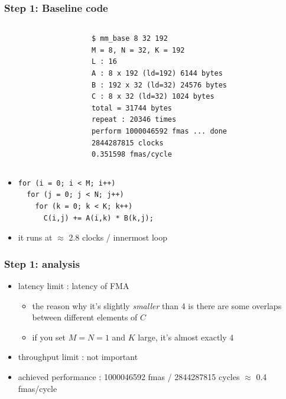 \documentclass[12pt,dvipdfmx]{beamer}
\newcommand{\ao}[1]{{\color{blue}#1}}
\begin{document}
\begin{frame}[fragile]
\frametitle{Step 1: Baseline code}

\begin{columns}
  \begin{column}{0.55\textwidth}
\begin{center}
\def\svgwidth{0.8\textwidth}
{\scriptsize }
\end{center}
  \end{column}
  \begin{column}{0.4\textwidth}
\begin{lstlisting}
$ mm_base 8 32 192
M = 8, N = 32, K = 192
L : 16
A : 8 x 192 (ld=192) 6144 bytes
B : 192 x 32 (ld=32) 24576 bytes
C : 8 x 32 (ld=32) 1024 bytes
total = 31744 bytes
repeat : 20346 times
perform 1000046592 fmas ... done
2844287815 clocks
0.351598 fmas/cycle
\end{lstlisting}%
  \end{column}
\end{columns}

\begin{itemize}
\item []
\begin{lstlisting}
for (i = 0; i < M; i++)  
  for (j = 0; j < N; j++)  
    for (k = 0; k < K; k++)  
      C(i,j) += A(i,k) * B(k,j);
\end{lstlisting}
\end{itemize}

\begin{itemize}
\item it runs at $\approx$ 2.8 clocks / innermost loop
\end{itemize}
\end{frame}

\begin{frame}[fragile]
\frametitle{Step 1: analysis}
\begin{itemize}
\item latency limit : latency of FMA
  \begin{itemize}
  \item the reason why it's slightly {\it smaller} than 4
    is there are some overlaps between different elements of $C$
  \item if you set $M = N = 1$ and $K$ large, it's almost exactly 4
  \end{itemize}
\item throughput limit : not important

\item achieved performance :
  1000046592 fmas / 2844287815 cycles $\approx$ \ao{0.4} fmas/cycle
\end{itemize}
\end{frame}
\end{document}

